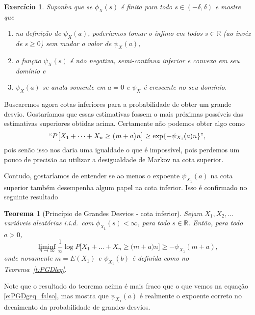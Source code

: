 \documentclass[reqno, final]{book}
\newcommand*\1{\mathds{1}}
\newtheorem{theorem}{Teorema}[section]
\newtheorem{exercise}[example]{Exercício}
\def \iid{i.i.d.~}
\begin{document}

\begin{exercise}
  Suponha que se $\phi_{X}(s)$ é finita para todo $s \in (-\delta, \delta)$ e mostre que
  \begin{enumerate}[\quad a)]
  \item na definição de $\psi_{X}(a)$, poderíamos tomar o ínfimo em todos $s \in \mathbb{R}$ (ao invéz de $s \geq 0$) sem mudar o valor de $\psi_X(a)$,
  \item a função $\psi_{X}(s)$ é não negativa, semi-contínua inferior e convexa em seu domínio e
  \item $\psi_X(a)$ se anula somente em $a = 0$ e $\psi_X$ é crescente no seu domínio.
  \end{enumerate}
\end{exercise}

Buscaremos agora cotas inferiores para a probabilidade de obter um grande desvio.
Gostaríamos que essas estimativas fossem o mais próximas possíveis das estimativas superiores obtidas acima.
Certamente não podemos obter algo como
\begin{equation}
  \label{e:PGDgeq_falso}
  `` P\big[ X_1 + \dots + X_n \geq \big(m + a \big) n \big] \geq \exp\{-\psi_{X_1}(a) n\} ",
\end{equation}
pois senão isso nos daria uma igualdade o que é impossível, pois perdemos um pouco de precisão ao utilizar a desigualdade de Markov na cota superior.

Contudo, gostaríamos de entender se ao menos o expoente $\psi_{X_1}(a)$ na cota superior também desempenha algum papel na cota inferior.
Isso é confirmado no seguinte resultado

\begin{theorem}[Princípio de Grandes Desvios - cota inferior]
  \label{t:PGDgeq}
  Sejam $X_1, X_2, \dots$ variáveis aleatórias \iid com $\phi_{X_1}(s) < \infty$, para todo $s \in \mathbb{R}$.
  Então, para todo $a > 0$,
  \begin{equation}
    \liminf_{n \to \infty} \frac{1}{n} \log P\big[ X_1 + \dots + X_n \geq \big(m + a \big) n \big] \geq -\psi_{X_1}(m + a),
  \end{equation}
  onde novamente $m = E(X_1)$ e $\psi_{X_1}(b)$ é definida como no Teorema~\ref{t:PGDleq}.
\end{theorem}

Note que o resultado do teorema acima é mais fraco que o que vemos na equação \eqref{e:PGDgeq_falso}, mas mostra que $\psi_{X_1}(a)$ é realmente o expoente correto no decaimento da probabilidade de grandes desvios.
\end{document}
